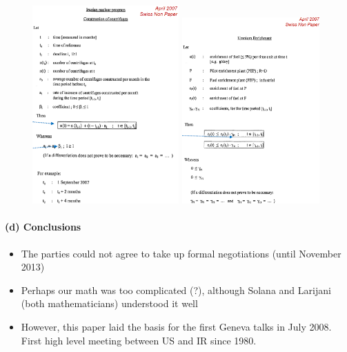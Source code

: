 \begin{figure}[H]
    \centering
    \includegraphics[width=0.5\textwidth]{Pictures/iran_nuclear_program_1.png}
    \hspace{5pt}
    \includegraphics[width=0.47\textwidth]{Pictures/iran_nuclear_program_2.png}
\end{figure}

\paragraph{(d) Conclusions}

\begin{itemize}
    \item The parties could not agree to take up formal negotiations (until
        November 2013)
    \item Perhaps our math was too complicated (?), although
        Solana and Larijani (both mathematicians) understood it well
    \item However, this paper laid the basis for the first Geneva talks
        in July 2008. First high level meeting between US and IR since
        1980.
\end{itemize}

